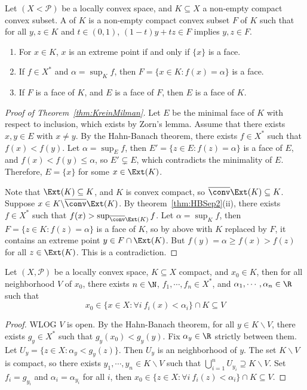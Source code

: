 \documentclass[a4paper]{article}
\begin{document}
Let $(X<\mathcal{P})$ be a locally convex space, and $K\subseteq X$ a non-empty compact convex subset. A  of $K$ is a non-empty compact convex subset $F$ of $K$ such that for all $y,z\in K$ and $t\in(0,1)$, $(1-t)y+tz\in F$ implies $y,z\in F$.

\begin{eg}
	\begin{enumerate}[label=(\arabic*)]
		\item For $x\in K$, $x$ is an extreme point if and only if $\{x\}$ is a face.
		\item If $f\in X^*$ and $\alpha=\sup_K f$, then $F=\{x\in K:f(x)=\alpha\}$ is a face.
		\item If $F$ is a face of $K$, and $E$ is a face of $F$, then $E$ is a face of $K$.
	\end{enumerate}
\end{eg}

\begin{proof}[Proof of Theorem~\ref{thm:KreinMilman}]
  Let $E$ be the minimal face of $K$ with respect to inclusion, which exists by Zorn's lemma. Assume that there exists $x,y\in E$ with $x\not= y$. By the Hahn-Banach theorem, there exists $f\in X^*$ such that $f(x)<f(y)$. Let $\alpha=\sup_E f$, then $E'=\{z\in E:f(z)=\alpha\}$ is a face of $E$, and $f(x)<f(y)\leq\alpha$, so $E'\subsetneq E$, which contradicts the minimality of $E$. Therefore, $E=\{x\}$ for some $x\in\Ext(K)$.

  Note that $\Ext(K)\subseteq K$, and $K$ is convex compact, so $\overline{\conv}\Ext(K)\subseteq K$. Suppose $x\in K\backslash\overline{\conv}\Ext(K)$. By theorem~\ref{thm:HBSep2}(ii), there exists $f\in X^*$ such that $f(x)>\sup_{\overline{\conv}\Ext(K)} f$. Let $\alpha=\sup_K f$, then $F=\{z\in K:f(z)=\alpha\}$ is a face of $K$, so by above with $K$ replaced by $F$, it contains an extreme point $y\in F\cap\Ext(K)$. But $f(y)=\alpha\geq f(x)>f(z)$ for all $z\in\Ext(K)$. This is a contradiction.
\end{proof}

\begin{nlemma}\label{lem:PreChoquet}
  Let $(X,\mathcal{P})$ be a locally convex space, $K\subseteq X$ compact, and $x_0\in K$, then for all neighborhood $V$ of $x_0$, there exists $n\in\N$, $f_1,\cdots,f_n\in X^*$, and $\alpha_1,\cdots,\alpha_n\in\R$ such that
\[x_0\in\{x\in X:\forall i\ f_i(x)<\alpha_i\}\cap K\subseteq V\]
\end{nlemma}

\begin{proof}
  WLOG $V$ is open. By the Hahn-Banach theorem, for all $y\in K\backslash V$, there exists $g_y\in X^*$ such that $g_y(x_0)<g_y(y)$. Fix $\alpha_y\in\R$ strictly between them. Let $U_y=\{z\in X:\alpha_y<g_y(z)\}$. Then $U_y$ is an neighborhood of $y$. The set $K\backslash V$ is compact, so there exists $y_1,\cdots,y_n\in K\backslash V$ such that $\bigcup_{i=1}^n U_{y_i}\supseteq K\backslash V$. Set $f_i=g_{y_i}$ and $\alpha_i=\alpha_{y_i}$ for all $i$, then $x_0\in\{z\in X:\forall i\ f_i(z)<\alpha_i\}\cap K\subseteq V$.
\end{proof}
\end{document}
